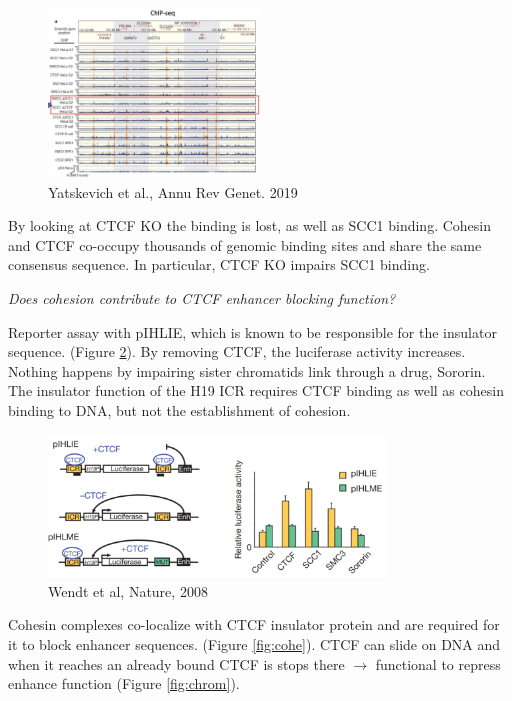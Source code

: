 \begin{figure}
\centering
\includegraphics[width=0.5\textwidth]{../_resources/Screenshot_2022-10-14_at_19-51-43.png}
\caption{Yatskevich et al., Annu Rev Genet. 2019}
\label{fig:chip}
\end{figure}

By looking at CTCF KO the binding is lost, as well as SCC1 binding. Cohesin and CTCF co-occupy thousands of genomic binding sites and share the same consensus sequence. In particular, CTCF KO impairs SCC1 binding.

\emph{Does cohesion contribute to CTCF enhancer blocking function?}

Reporter assay with pIHLIE, which is known to be responsible for the insulator sequence. (Figure \ref{fig:rep}). By removing CTCF, the luciferase activity increases. Nothing happens by impairing sister chromatids link through a drug, Sororin. The insulator function of the H19 ICR requires CTCF binding as well as cohesin binding to DNA, but not the establishment of cohesion.

\begin{figure}
\centering
\includegraphics[width=0.8\textwidth]{../_resources/Screenshot_2022-10-14_at_19-50-44.png}
\caption{Wendt et al, Nature, 2008}
\label{fig:rep}
\end{figure}

Cohesin complexes co-localize with CTCF insulator protein and are required for it to block enhancer sequences. (Figure \ref{fig:cohe}). CTCF can slide on DNA and when it reaches an already bound CTCF is stops there $\rightarrow$ functional to repress enhance function (Figure \ref{fig:chrom}).

